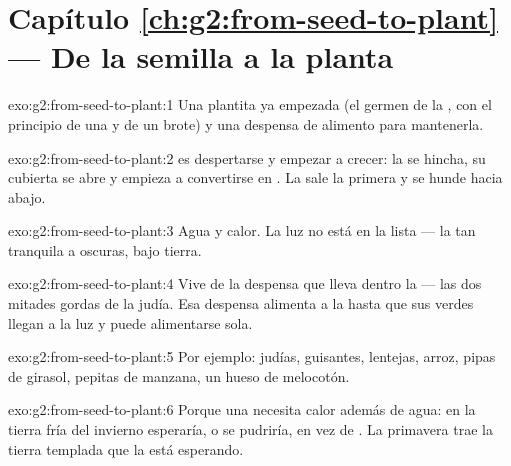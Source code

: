 \section*{Capítulo \ref{ch:g2:from-seed-to-plant} --- De la semilla a la planta}

\begin{solution}{exo:g2:from-seed-to-plant:1}
Una plantita ya empezada (el germen de la , con el principio de
una  y de un brote) y una despensa de alimento para mantenerla.
\end{solution}

\begin{solution}{exo:g2:from-seed-to-plant:2}
 es despertarse y empezar a crecer: la  se hincha, su
cubierta se abre y empieza a convertirse en . La  sale la
primera y se hunde hacia abajo.
\end{solution}

\begin{solution}{exo:g2:from-seed-to-plant:3}
Agua y calor. La luz no está en la lista --- la   tan
tranquila a oscuras, bajo tierra.
\end{solution}

\begin{solution}{exo:g2:from-seed-to-plant:4}
Vive de la despensa que lleva dentro la  --- las dos mitades
gordas de la judía. Esa despensa alimenta a la  hasta que sus
 verdes llegan a la luz y puede alimentarse sola.
\end{solution}

\begin{solution}{exo:g2:from-seed-to-plant:5}
Por ejemplo: judías, guisantes, lentejas, arroz, pipas de girasol,
pepitas de manzana, un hueso de melocotón.
\end{solution}

\begin{solution}{exo:g2:from-seed-to-plant:6}
Porque una  necesita calor además de agua: en la tierra fría
del invierno esperaría, o se pudriría, en vez de . La
primavera trae la tierra templada que la  está esperando.
\end{solution}

